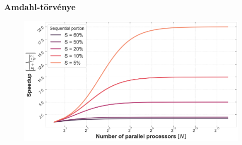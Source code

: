 \begin{frame}
\frametitle{Amdahl-törvénye}

\begin{figure}
	\includegraphics[width=\textwidth]{img/amdahls_law.png}
\end{figure}

\end{frame}